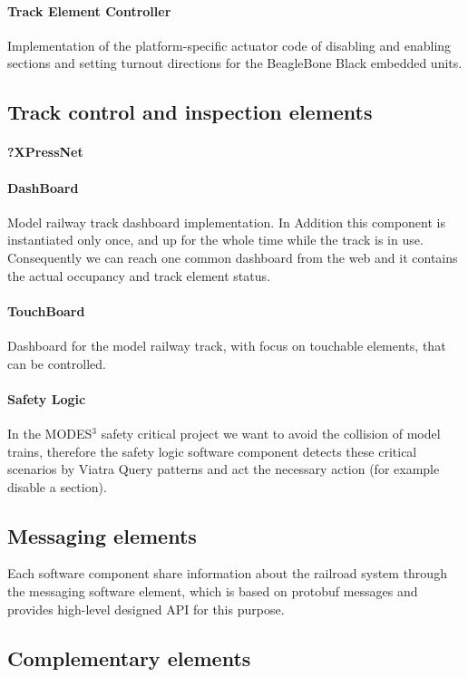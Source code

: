 \paragraph{Track Element Controller}
Implementation of the platform-specific actuator code of disabling and enabling sections and setting turnout directions for the BeagleBone Black embedded units.

\subsection{Track control and inspection elements}
\paragraph{?XPressNet}
\paragraph{DashBoard}
Model railway track dashboard implementation. In Addition this component is instantiated only once, and up for the whole time while the track is in use. Consequently we can reach one common dashboard from the web and it contains the actual occupancy and track element status.
\paragraph{TouchBoard}
Dashboard for the model railway track, with focus on touchable elements, that can be controlled.
\paragraph{Safety Logic}
In the MODES$^3$ safety critical project we want to avoid the collision of model trains, therefore the safety logic software component detects these critical scenarios by Viatra Query patterns and act the necessary action (for example disable a section).

\subsection{Messaging elements}
Each software component share information about the railroad system through the messaging software element, which is based on protobuf messages and provides high-level designed API for this purpose. 

\subsection{Complementary elements}
